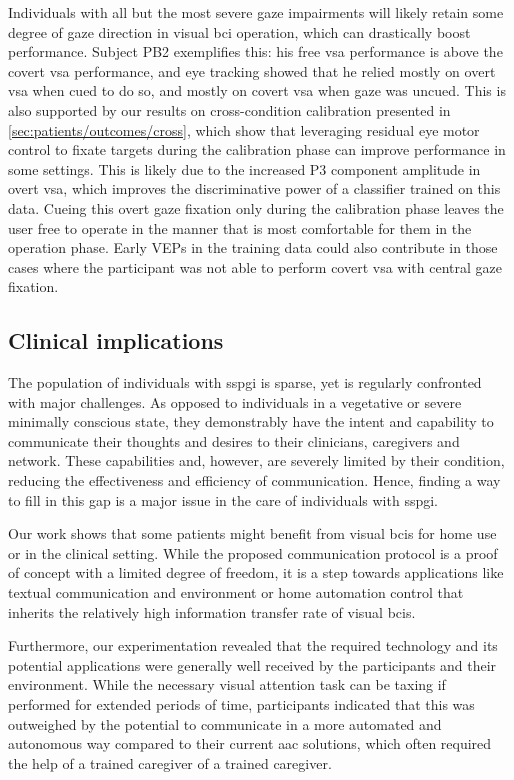 \documentclass[twocolumn]{article}
\begin{document}
Individuals with all but the most severe gaze impairments will likely retain
some degree of gaze direction in visual \ac{bci} operation, which can
drastically boost performance.
Subject PB2 exemplifies this: his free \ac{vsa} performance is above the covert
\ac{vsa} performance, and eye tracking showed that he relied mostly
on overt \ac{vsa} when cued to do so, and mostly on covert \ac{vsa} when
gaze was uncued.
This is also supported by our results on cross-condition calibration presented
in \cref{sec:patients/outcomes/cross}, which show that leveraging residual
eye motor control to fixate targets during the calibration phase can improve
performance in some settings.
This is likely due to the increased P3 component amplitude in overt \ac{vsa},
which improves the discriminative power of a classifier trained on this data.
Cueing this overt gaze fixation only during the calibration phase leaves the user
free to operate in the manner that is most comfortable for them in the
operation phase.
Early VEPs in the training data could also contribute in those cases where the participant was not
able to perform covert \ac{vsa} with central gaze fixation.

\subsection{Clinical implications}
The population of individuals with \ac{sspgi} is sparse, yet is regularly
confronted with major challenges.
As opposed to individuals in a vegetative or severe minimally conscious state,
they demonstrably have the intent and capability to communicate their thoughts
and desires to their clinicians, caregivers and network.
These capabilities and, however, are severely limited by their condition,
reducing the effectiveness and efficiency of communication.
Hence, finding a way to fill in this gap is a major issue in the care of
individuals with \ac{sspgi}.

Our work shows that some patients might benefit from visual \acp{bci}
for home use or in the clinical setting.
While the proposed communication protocol is a proof of concept with a limited degree
of freedom, it is a step towards applications like textual communication and
environment or home automation control that inherits the relatively high
information transfer rate of visual \acp{bci}.

Furthermore, our experimentation revealed that the required technology and its
potential applications were generally well received by the participants and their
environment.
While the necessary visual attention task can be taxing if performed for
extended
periods of time, participants indicated that this was outweighed by the
potential to communicate in a more automated and autonomous way compared to
their current \ac{aac} solutions, which often required the help of a trained caregiver of a trained
caregiver.
\end{document}
